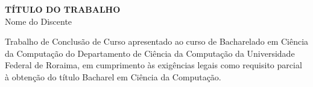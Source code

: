 \begin{titlepage}
    \begin{center}
        {\bfseries\LARGE TÍTULO DO TRABALHO}\\[4cm]

        {\Large Nome do Discente}\\[4cm]

        \begin{flushright}
            \parbox{9cm}{\setlength{\parindent}{0pt}
            Trabalho de Conclusão de Curso apresentado ao curso de Bacharelado em Ciência da Computação do Departamento de Ciência da Computação da Universidade Federal de Roraima, em cumprimento às exigências legais como requisito parcial à obtenção do título Bacharel em Ciência da Computação.
            }
        \end{flushright}


\end{center}
\end{titlepage}
